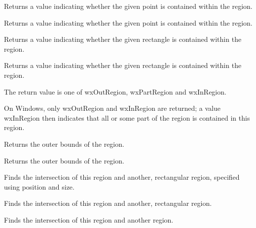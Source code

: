 
Returns a value indicating whether the given point is contained within the region.


Returns a value indicating whether the given point is contained within the region.


Returns a value indicating whether the given rectangle is contained within the region.


Returns a value indicating whether the given rectangle is contained within the region.


The return value is one of wxOutRegion, wxPartRegion and wxInRegion.

On Windows, only wxOutRegion and wxInRegion are returned; a value wxInRegion then indicates that
all or some part of the region is contained in this region.

\label{wxregiongetbox}


Returns the outer bounds of the region.


Returns the outer bounds of the region.

\label{wxregionintersect}


Finds the intersection of this region and another, rectangular region, specified using position and size.


Finds the intersection of this region and another, rectangular region.


Finds the intersection of this region and another region.

